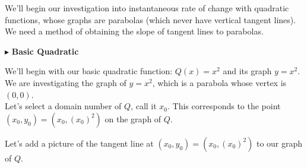 \documentclass{ximera}
\begin{document}
We'll begin our investigation into instantaneous rate of change with quadratic functions, whose graphs are parabolas (which never have vertical tangent lines). \\


We need a method of obtaining the slope of tangent lines to parabolas.







$\blacktriangleright$ \textbf{Basic Quadratic}


We'll begin with our basic quadratic function: \textbf{\textcolor{purple!85!blue}{$Q(x) = x^2$}} and its graph \textbf{\textcolor{purple!85!blue}{$y = x^2$}}. \\


We are investigating the graph of $y = x^2$, which is a parabola whose vertex is $(0, 0)$. \\

Let's select a domain number of $Q$, call it $x_0$.   This corresponds to the point $(x_0, y_0) = (x_0, (x_0)^2)$ on the graph of $Q$.

Let's add a picture of the tangent line at $(x_0, y_0) = (x_0, (x_0)^2)$ to our graph of $Q$.


\begin{image}
\end{image}
\end{document}
